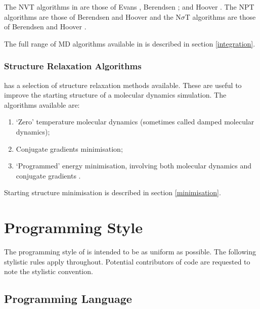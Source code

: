 The NVT algorithms in \D{} are those of Evans \cite{evans-84a}, Berendsen
\cite{berendsen-84a}; and Hoover
\cite{hoover-85a}. The NPT algorithms are those of
Berendsen \cite{berendsen-84a} and
Hoover \cite{hoover-85a} and the N$\sigma$T
algorithms are those of Berendsen
\cite{berendsen-84a} and Hoover
\cite{hoover-85a}.

The full range of MD algorithms available in \D{} is
described in section \ref{integration}.

\subsubsection{Structure Relaxation Algorithms}

\D{} has a selection of structure relaxation methods available. These 
are useful to improve the starting structure of a molecular dynamics 
simulation. The algorithms available are:

\begin{enumerate}
\item `Zero' temperature molecular dynamics (sometimes called damped molecular dynamics);
\item Conjugate gradients minimisation;
\item `Programmed' energy minimisation, involving both molecular dynamics and conjugate gradients .
\end{enumerate}

Starting structure minimisation is described in section \ref{minimisation}.

\section{Programming Style}

The programming style of \D{} is intended to be as uniform as
possible. The following stylistic rules apply throughout. Potential
contributors of code are requested to note the stylistic convention.

\subsection{Programming Language}

